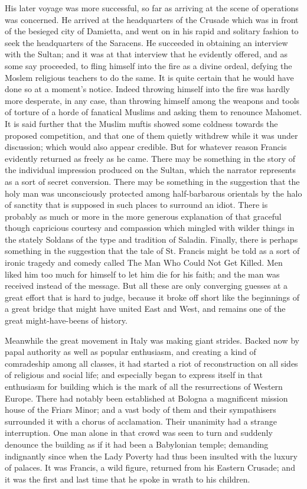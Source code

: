 \documentclass{book}
\begin{document}
His later voyage was more successful, so far as arriving at the scene of operations was concerned. He arrived at the headquarters of the Crusade which was in front of the besieged city of Damietta, and went on in his rapid and solitary fashion to seek the headquarters of the Saracens. He succeeded in obtaining an interview with the Sultan; and it was at that interview that he evidently offered, and as some say proceeded, to fling himself into the fire as a divine ordeal, defying the Moslem religious teachers to do the same. It is quite certain that he would have done so at a moment’s notice. Indeed throwing himself into the fire was hardly more desperate, in any case, than throwing himself among the weapons and tools of torture of a horde of fanatical Muslims and asking them to renounce Mahomet. It is said further that the Muslim muftis showed some coldness towards the proposed competition, and that one of them quietly withdrew while it was under discussion; which would also appear credible. But for whatever reason Francis evidently returned as freely as he came. There may be something in the story of the individual impression produced on the Sultan, which the narrator represents as a sort of secret conversion. There may be something in the suggestion that the holy man was unconsciously protected among half-barbarous orientals by the halo of sanctity that is supposed in such places to surround an idiot. There is probably as much or more in the more generous explanation of that graceful though capricious courtesy and compassion which mingled with wilder things in the stately Soldans of the type and tradition of Saladin. Finally, there is perhaps something in the suggestion that the tale of St. Francis might be told as a sort of ironic tragedy and comedy called The Man Who Could Not Get Killed. Men liked him too much for himself to let him die for his faith; and the man was received instead of the message. But all these are only converging guesses at a great effort that is hard to judge, because it broke off short like the beginnings of a great bridge that might have united East and West, and remains one of the great might-have-beens of history.

Meanwhile the great movement in Italy was making giant strides. Backed now by papal authority as well as popular enthusiasm, and creating a kind of comradeship among all classes, it had started a riot of reconstruction on all sides of religious and social life; and especially began to express itself in that enthusiasm for building which is the mark of all the resurrections of Western Europe. There had notably been established at Bologna a magnificent mission house of the Friars Minor; and a vast body of them and their sympathisers surrounded it with a chorus of acclamation. Their unanimity had a strange interruption. One man alone in that crowd was seen to turn and suddenly denounce the building as if it had been a Babylonian temple; demanding indignantly since when the Lady Poverty had thus been insulted with the luxury of palaces. It was Francis, a wild figure, returned from his Eastern Crusade; and it was the first and last time that he spoke in wrath to his children.
\end{document}
